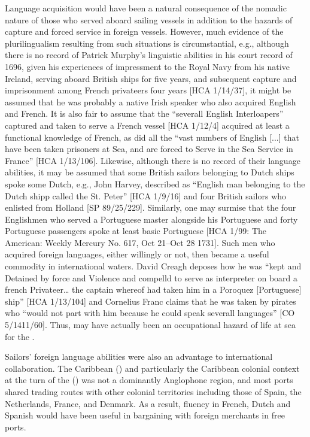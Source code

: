 Language acquisition would have been a natural consequence of the nomadic nature of those who served aboard sailing vessels in addition to the hazards of capture and forced service in foreign vessels. However, much evidence of the plurilingualism resulting from such situations is circumstantial, e.g., although there is no record of Patrick Murphy’s linguistic abilities in his court record of 1696, given his experiences of impressment to the Royal Navy from his native Ireland, serving aboard British ships for five years, and subsequent capture and imprisonment among French privateers four years [HCA 1/14/37], it might be assumed that he was probably a native Irish speaker who also acquired English and French. It is also fair to assume that the “severall English Interloapers” captured and taken to serve a French vessel [HCA 1/12/4] acquired at least a functional knowledge of French, as did all the “vast numbers of English [...] that have been taken prisoners at Sea, and are forced to Serve in the Sea Service in France” [HCA 1/13/106].  Likewise, although there is no record of their language abilities, it may be assumed that some British sailors belonging to Dutch ships spoke some Dutch, e.g., John Harvey, described as “English man belonging to the Dutch shipp called the St. Peter” [HCA 1/9/16] and four British sailors who enlisted from Holland [SP 89/25/229]. Similarly, one may surmise that the four Englishmen who served a Portuguese master alongside his Portuguese  and forty Portuguese passengers spoke at least basic Portuguese [HCA 1/99: The American: Weekly Mercury No. 617, Oct 21–Oct 28 1731]. Such men who acquired foreign languages, either willingly or not, then became a useful commodity in international waters. David Creagh deposes how he was “kept and Detained by force and Violence and compelld to serve as interpreter on board a french Privateer… the captain whereof had taken him in a Poroquez [Portuguese] ship” [HCA 1/13/104] and Cornelius Franc claims that he was taken by pirates who “would not part with him because he could speak severall languages” [CO 5/1411/60]. Thus,  may have actually been an occupational hazard of life at sea for the . 

Sailors’ foreign language abilities were also an advantage to international collaboration. The Caribbean () and particularly the Caribbean colonial context at the turn of the  () was not a dominantly Anglophone region, and most ports shared trading routes with other colonial territories including those of Spain, the Netherlands, France, and Denmark. As a result, fluency in French, Dutch and Spanish would have been useful in bargaining with foreign merchants in free ports.

